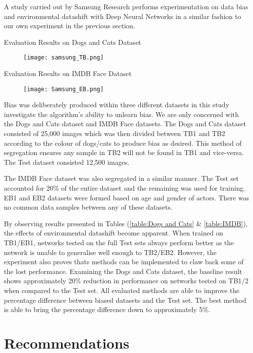 \bigskip
A study carried out by Samsung Research \cite{8953715} performs experimentation on data bias and environmental datashift with Deep Neural Networks in a similar fashion to our own experiment in the previous section.

\begin{table}[H]
    \caption{Evaluation Results on Dogs and Cats Dataset \cite{8953715}}
    \begin{figure}[H]
        \texttt{[image: samsung\_TB.png]}
        \centering
    \end{figure}
    \label{table:Dogs and Cats}
\end{table}

\begin{table}[H]
    \caption{Evaluation Results on IMDB Face Dataset \cite{8953715}}
    \begin{figure}[H]
        \texttt{[image: Samsung\_EB.png]}
        \centering
    \end{figure}
    \label{table:IMDB}
\end{table}

Bias was deliberately produced within three different datasets in this study investigate the algorithm's ability to unlearn bias. 
We are only concerned with the Dogs and Cats dataset and IMDB Face datasets.
The Dogs and Cats dataset consisted of 25,000 images which was then divided between TB1 and TB2 according to the colour of dogs/cats to produce bias as desired.
This method of segregation ensures any sample in TB2 will not be found in TB1 and vice-versa.
The Test dataset consisted 12,500 images. 

The IMDB Face dataset was also segregated in a similar manner.
The Test set accounted for 20\% of the entire dataset and the remaining was used for training.
EB1 and EB2 datasets were formed based on age and gender of actors. There was no common data samples between any of these datasets.

By observing results presented in Tables (\ref{table:Dogs and Cats} \& \ref{table:IMDB}), the effects of environmental datashift become apparent.
When trained on TB1/EB1, networks tested on the full Test sets always perform better as the network is unable to generalise well enough to TB2/EB2.
However, the experiment also proves thats methods can be implemented to claw back some of the lost performance. 
Examining the Dogs and Cats dataset, the baseline result shows approximately 20\% reduction in performance on networks tested on TB1/2 when compared to the Test set.
All evaluated methods are able to improve the percentage difference between biased datasets and the Test set. 
The best method is able to bring the percentage difference down to approximately 5\%.

\section{Recommendations}
